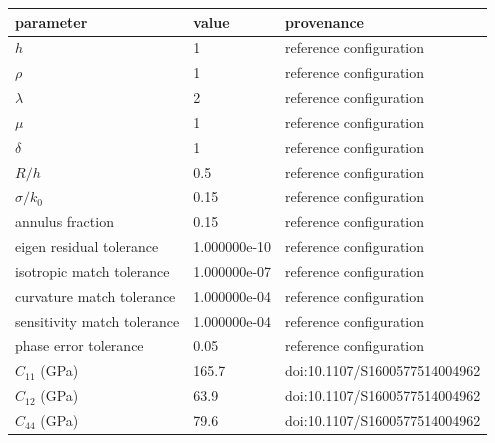 \begin{tabular}{lll}
\hline
parameter & value & provenance \\
\hline
$h$ & 1 & reference configuration \\
$\rho$ & 1 & reference configuration \\
$\lambda$ & 2 & reference configuration \\
$\mu$ & 1 & reference configuration \\
$\delta$ & 1 & reference configuration \\
$R/h$ & 0.5 & reference configuration \\
$\sigma/k_0$ & 0.15 & reference configuration \\
annulus fraction & 0.15 & reference configuration \\
eigen residual tolerance & 1.000000e-10 & reference configuration \\
isotropic match tolerance & 1.000000e-07 & reference configuration \\
curvature match tolerance & 1.000000e-04 & reference configuration \\
sensitivity match tolerance & 1.000000e-04 & reference configuration \\
phase error tolerance & 0.05 & reference configuration \\
$C_{11}$ (GPa) & 165.7 & doi:10.1107/S1600577514004962 \\
$C_{12}$ (GPa) & 63.9 & doi:10.1107/S1600577514004962 \\
$C_{44}$ (GPa) & 79.6 & doi:10.1107/S1600577514004962 \\
\hline
\end{tabular}

